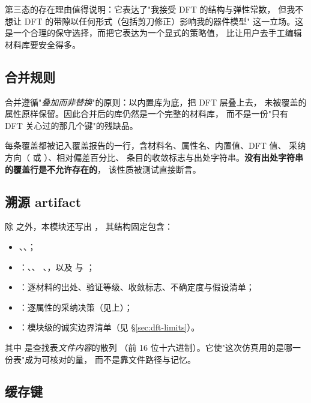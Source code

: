 第三态的存在理由值得说明：它表达了"我接受 DFT 的结构与弹性常数，
但我不想让 DFT 的带隙以任何形式（包括剪刀修正）影响我的器件模型"
这一立场。这是一个合理的保守选择，而把它表达为一个显式的策略值，
比让用户去手工编辑材料库要安全得多。

\subsection{合并规则}

合并遵循"\emph{叠加而非替换}"的原则：以内置库为底，把 DFT 层叠上去，
未被覆盖的属性原样保留。因此合并后的库仍然是一个完整的材料库，
而不是一份"只有 DFT 关心过的那几个键"的残缺品。

每条覆盖都被记入覆盖报告的一行，含材料名、属性名、内置值、DFT 值、
采纳方向（ 或 ）、相对偏差百分比、
条目的收敛标志与出处字符串。\textbf{没有出处字符串的覆盖行是不允许存在的}，
该性质被测试直接断言。

\subsection{溯源 artifact}
\label{sec:dft-provenance}

除  之外，本模块还写出 ，
其结构固定包含：

\begin{itemize}[leftmargin=1.7em,itemsep=0.28em,topsep=0.35em]
  \item {}、、；
  \item {}：、、
        、，以及
         与 ；
  \item {}：逐材料的出处、验证等级、收敛标志、不确定度与假设清单；
  \item {}：逐属性的采纳决策（见上）；
  \item {}：模块级的诚实边界清单（见 \S\ref{sec:dft-limits}）。
\end{itemize}

其中  是查找表\emph{文件内容}的散列
（前 16 位十六进制）。它使"这次仿真用的是哪一份表"成为可核对的量，
而不是靠文件路径与记忆。

\subsection{缓存键}

